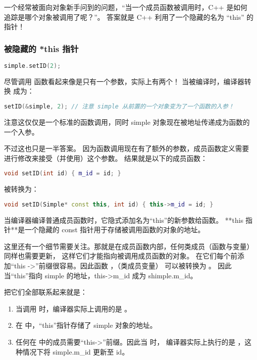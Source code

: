 \documentclass[../../LearnCpp.tex]{subfiles}
\begin{document}

一个经常被面向对象新手问到的问题，“当一个成员函数被调用时，C++ 是如何追踪是哪个对象被调用了呢？”。
答案就是 C++ 利用了一个隐藏的名为 “this” 的指针！

\subsubsection*{被隐藏的 *this 指针}

\begin{lstlisting}[language=C++]
simple.setID(2);
\end{lstlisting}

尽管调用  函数看起来像是只有一个参数，实际上有两个！
当被编译时，编译器转换  成为：

\begin{lstlisting}[language=C++]
setID(&simple, 2); // 注意 simple 从前置的一个对象变为了一个函数的入参！
\end{lstlisting}

注意这仅仅是一个标准的函数调用，同时 simple 对象现在被地址传递成为函数的一个入参。

不过这也只是一半答案。
因为函数调用现在有了额外的参数，成员函数定义需要进行修改来接受（并使用）这个参数。
结果就是以下的成员函数：

\begin{lstlisting}[language=C++]
void setID(int id) { m_id = id; }
\end{lstlisting}

被转换为：

\begin{lstlisting}[language=C++]
void setID(Simple* const this, int id) { this->m_id = id; }
\end{lstlisting}

当编译器编译普通成员函数时，它隐式添加名为“this”的新参数给函数。
**this 指针**是一个隐藏的 const 指针用于存储被调用函数的对象的地址。

这里还有一个细节需要关注。那就是在成员函数内部，任何类成员（函数与变量）同样也需要更新，
这样它们才能指向被调用成员函数的对象。
在它们每个前添加“this ->”前缀很容易。因此函数 ，（类成员变量）
可以被转换为 。
因此当“this”指向 simple 的地址，this->m\_id 成为 shimple.m\_id。

把它们全部联系起来就是：

\begin{enumerate}
    \item 当调用  时，编译器实际上调用的是 。
    \item 在  中，“this”指针存储了 simple 对象的地址。
    \item 任何在  中的成员需要“this->”前缀。因此当  时，
          编译器实际上执行的是 ，这种情况下将 simple.m\_id 更新至 id。
\end{enumerate}
\end{document}
